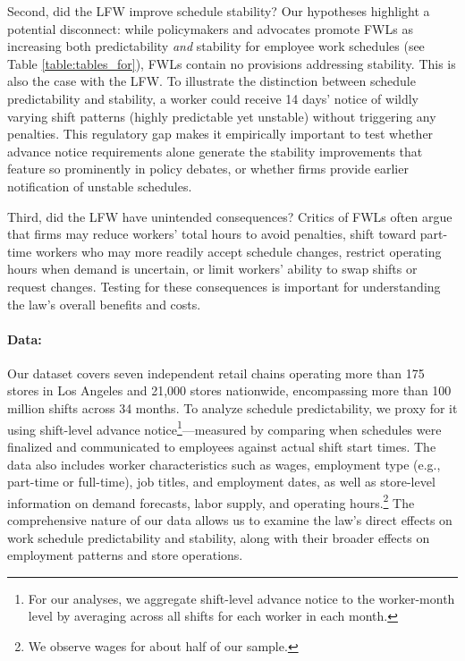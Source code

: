 \documentclass[letterpaper,11pt,leqno]{article}
\theoremstyle{paper}
\begin{document}
Second, did the LFW improve schedule stability? Our hypotheses highlight a potential disconnect: while policymakers and advocates promote FWLs as increasing both predictability \textit{and} stability for employee work schedules (see Table \ref{table:tables_for}), FWLs contain no provisions addressing stability. This is also the case with the LFW. To illustrate the distinction between schedule predictability and stability, a worker could receive 14 days' notice of wildly varying shift patterns (highly predictable yet unstable) without triggering any penalties. This regulatory gap makes it empirically important to test whether advance notice requirements alone generate the stability improvements that feature so prominently in policy debates, or whether firms provide earlier notification of unstable schedules.

Third, did the LFW have unintended consequences? Critics of FWLs often argue that firms may reduce workers' total hours to avoid penalties, shift toward part-time workers who may more readily accept schedule changes, restrict operating hours when demand is uncertain, or limit workers' ability to swap shifts or request changes. Testing for these consequences is important for understanding the law's overall benefits and costs. 

\paragraph{Data:}
Our dataset covers seven independent retail chains operating more than 175 stores in Los Angeles and 21,000 stores nationwide, encompassing more than 100 million shifts across 34 months. To analyze schedule predictability, we proxy for it using shift-level advance notice\footnote{For our analyses, we aggregate shift-level advance notice to the worker-month level by averaging across all shifts for each worker in each month.}—measured by comparing when schedules were finalized and communicated to employees against actual shift start times. The data also includes worker characteristics such as wages, employment type (e.g., part-time or full-time), job titles, and employment dates, as well as store-level information on demand forecasts, labor supply, and operating hours.\footnote{We observe wages for about half of our sample.} The comprehensive nature of our data allows us to examine the law's direct effects on work schedule predictability and stability, along with their broader effects on employment patterns and store operations.
\end{document}
